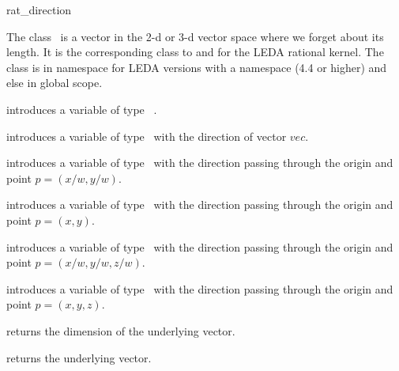 \ccDefGlobalScope{}
\begin{ccRefClass}{rat_direction}

\ccDefinition


The class \ccRefName\  is a vector in the 2-d or 3-d vector space where we forget about its length.
It is the corresponding class to  and  for the LEDA
rational kernel.
The class is in namespace  for LEDA versions with a namespace
(4.4 or higher) and else in global scope.



\ccCreation

{introduces a variable of type \ccRefName\ .}      
   
{introduces a variable of type \ccRefName\ with the direction of vector $vec$.}   
   
{introduces a variable of type \ccRefName\ with the direction passing
through the origin and point $p=(x/w,y/w)$.}  

{introduces a variable of type \ccRefName\ with the direction passing
through the origin and point $p=(x,y)$.}   
   
{introduces a variable of type \ccRefName\ with the direction passing
through the origin and point $p=(x/w,y/w,z/w)$.}    

{introduces a variable of type \ccRefName\ with the direction passing
through the origin and point $p=(x,y,z)$.}  


\ccOperations

{returns the dimension of the underlying vector.}   
   
{returns the underlying vector.}  
 

\end{ccRefClass} 

